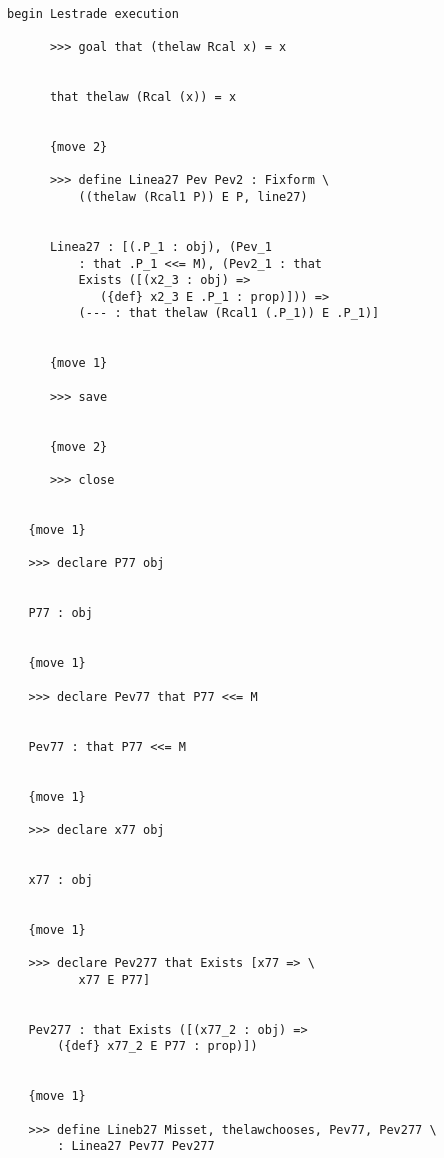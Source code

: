 \documentclass[12pt]{article}
\begin{document}
\begin{verbatim}

begin Lestrade execution

      >>> goal that (thelaw Rcal x) = x


      that thelaw (Rcal (x)) = x


      {move 2}

      >>> define Linea27 Pev Pev2 : Fixform \
          ((thelaw (Rcal1 P)) E P, line27)


      Linea27 : [(.P_1 : obj), (Pev_1 
          : that .P_1 <<= M), (Pev2_1 : that 
          Exists ([(x2_3 : obj) => 
             ({def} x2_3 E .P_1 : prop)])) => 
          (--- : that thelaw (Rcal1 (.P_1)) E .P_1)]


      {move 1}

      >>> save


      {move 2}

      >>> close


   {move 1}

   >>> declare P77 obj


   P77 : obj


   {move 1}

   >>> declare Pev77 that P77 <<= M


   Pev77 : that P77 <<= M


   {move 1}

   >>> declare x77 obj


   x77 : obj


   {move 1}

   >>> declare Pev277 that Exists [x77 => \
          x77 E P77]


   Pev277 : that Exists ([(x77_2 : obj) => 
       ({def} x77_2 E P77 : prop)])


   {move 1}

   >>> define Lineb27 Misset, thelawchooses, Pev77, Pev277 \
       : Linea27 Pev77 Pev277



\end{verbatim}
\end{document}
